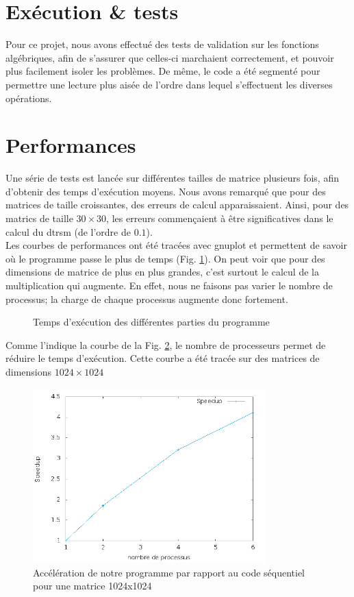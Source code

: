 \section{Exécution \& tests} %
\label{sec:execution}

Pour ce projet, nous avons effectué des tests de validation sur les fonctions algébriques, afin de s'assurer que celles-ci marchaient correctement, et pouvoir plus facilement isoler les problèmes. 
De même, le code a été segmenté pour permettre une lecture plus aisée de l'ordre dans lequel s'effectuent les diverses opérations.

\section{Performances} %
\label{sec:perf}

Une série de tests est lancée sur différentes tailles de matrice plusieurs fois, afin d'obtenir des temps d'exécution moyens. Nous avons remarqué que pour des matrices de taille croissantes, des erreurs de calcul apparaissaient. Ainsi, pour des matrics de taille $30 \times 30$, les erreurs commençaient à être significatives dans le calcul du dtrsm (de l'ordre de $0.1$).\\
Les courbes de performances ont été tracées avec gnuplot et permettent de savoir où le programme passe le plus de temps (Fig. \ref{fig:diff}). On peut voir que pour des dimensions de matrice de plus en plus grandes, c'est surtout le calcul de la multiplication qui augmente. En effet, nous ne faisons pas varier le nombre de processus; la charge de chaque processus augmente donc fortement.

\begin{figure}[H]
\centering
\caption{Temps d'exécution des différentes parties du programme}
\label{fig:diff}
\end{figure}

Comme l'indique la courbe de la Fig. \ref{fig:sp}, le nombre de processeurs permet de réduire le temps d'exécution. Cette courbe a été tracée sur des matrices de dimensions $1024\times1024$
\begin{figure}[H]
\centering
\includegraphics[width=0.8\textwidth]{Speedup.png}
\caption{Accélération de notre programme par rapport au code séquentiel pour une matrice 1024x1024}
\label{fig:sp}
\end{figure}

